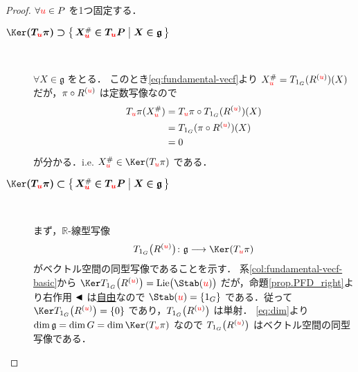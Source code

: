 \documentclass[TQFT_main]{subfiles}
\begin{document}
\begin{proof}
    $\forall \textcolor{red}{u} \in P$ を1つ固定する．
    \begin{description}
        \item[\textbf{$\bm{\Ker (T_{\textcolor{red}{u}} \pi) \supset \bigl\{\, X^\#_{\textcolor{red}{u}} \in T_{\textcolor{red}{u}} P \bigm| X \in \mathfrak{g} \,\bigr\}}$}]　
        
        $\forall X \in \mathfrak{g}$ をとる．
        このとき\eqref{eq:fundamental-vecf}より $X^\#_{\textcolor{red}{u}} = T_{1_G}(R^{(\textcolor{red}{u})})(X)$ だが，$\pi \circ R^{(\textcolor{red}{u})}$ は定数写像なので
        \begin{align}
            T_{\textcolor{red}{u}}\pi (X^\#_{\textcolor{red}{u}}) &= T_{\textcolor{red}{u}}\pi \circ T_{1_G}(R^{(\textcolor{red}{u})})(X) \\
            &= T_{1_G}(\pi \circ R^{(\textcolor{red}{u})}) (X) \\
            &= 0
        \end{align}
        が分かる．i.e. $X^\#_{\textcolor{red}{u}} \in \Ker (T_{\textcolor{red}{u}} \pi)$ である．
    
        \item[\textbf{$\bm{\Ker (T_{\textcolor{red}{u}} \pi) \subset \bigl\{\, X^\#_{\textcolor{red}{u}} \in T_{\textcolor{red}{u}} P \bigm| X \in \mathfrak{g} \,\bigr\}}$}]　
        
        まず，$\mathbb{R}$-線型写像
        \begin{align}
            T_{1_G}\bigl(R^{(\textcolor{red}{u})} \bigr) \colon \mathfrak{g} \lto \Ker (T_{\textcolor{red}{u}} \pi)
        \end{align}
        がベクトル空間の同型写像であることを示す．
        系\ref{col:fundamental-vecf-basic}から $\Ker T_{1_G}\bigl(R^{(\textcolor{red}{u})} \bigr) = \mathrm{Lie}\bigl( \Stab (\textcolor{red}{u}) \bigr)$ だが，命題\ref{prop.PFD_right}より右作用 $\blacktriangleleft$ は\hyperref[def:Lie-action]{自由}なので $ \Stab (\textcolor{red}{u}) = \{1_G\}$ である．従って $\Ker T_{1_G}\bigl(R^{(\textcolor{red}{u})} \bigr) = \{0\}$ であり，$T_{1_G}\bigl(R^{(\textcolor{red}{u})} \bigr)$ は単射．
        \eqref{eq:dim}より $\dim \mathfrak{g} = \dim G = \dim \Ker (T_{\textcolor{red}{u}} \pi)$ なので $T_{1_G}\bigl(R^{(\textcolor{red}{u})} \bigr)$ はベクトル空間の同型写像である．
        

\end{description}
\end{proof}
\end{document}
